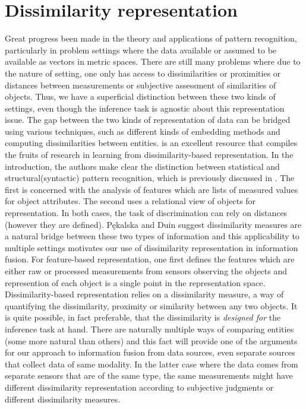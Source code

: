 \documentclass[12pt,oneside,final]{thesis}\usepackage[]{graphicx}\usepackage[]{color}
\begin{document}
\section{Dissimilarity representation\label{sec:dissim_repr}}
 Great progress been made in the theory and applications of pattern recognition, particularly in problem settings where the data available or assumed to be available as vectors in metric spaces. There are still many problems where due to the nature of setting, one only has access to dissimilarities or  proximities or distances between measurements or subjective assessment  of similarities of objects. Thus, we have a superficial distinction between these two kinds of settings, even though the inference task is agnostic about this representation issue. The gap between the two kinds of representation of data can be bridged using various  techniques, such as different kinds of embedding methods and computing dissimilarities between entities.
 \cite{duin2005dissimilarity} is an excellent resource that compiles the fruits of research in learning from  dissimilarity-based representation. In the introduction, the authors make clear the distinction between statistical and structural(syntactic) pattern recognition, which is previously discussed in \cite{NadlerSmith1993}. The first is concerned with the analysis of features which are lists of measured values for object attributes. The second uses a relational view of objects for representation. In both cases,  the task of discrimination  can rely on distances (however they are defined). P\k{e}kalska and Duin  suggest dissimilarity measures  are a natural bridge between these two types of information and this applicability to  multiple settings motivates our use of dissimilarity representation in information fusion. 
For feature-based representation, one first defines the features which are either raw or processed measurements from sensors observing the objects and  represention of each object is a single point in the representation space. Dissimilarity-based representation relies on a dissimilarity measure, a way of quantifying the dissimilarity, proximity or similarity between any two objects. It is quite possible, in fact preferable, that the dissimilarity is \emph{designed for} the inference task at hand. 
There are naturally multiple ways of comparing entities  (some more natural than others) and this fact will provide one of the arguments for our approach to information fusion from  data sources, even separate sources that collect  data of same modality. In  the latter case where the data comes from separate sensors that are of the same type, the same measurements might have different dissimilarity representation according to subjective judgments or different dissimilarity  measures. 
\end{document}
